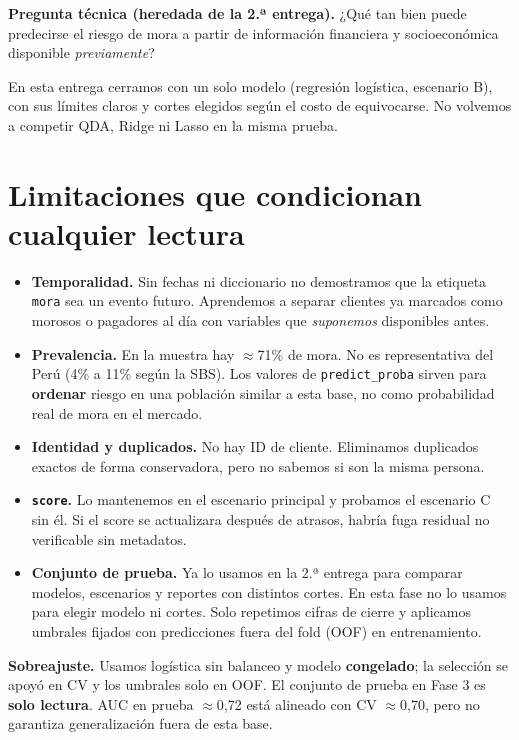 \documentclass[11pt]{article}
\begin{document}
\textbf{Pregunta técnica (heredada de la 2.ª entrega).} ¿Qué tan bien puede predecirse el riesgo de mora a partir de información financiera y socioeconómica disponible \emph{previamente}?

En esta entrega cerramos con un solo modelo (regresión logística, escenario B), con sus límites claros y cortes elegidos según el costo de equivocarse. No volvemos a competir QDA, Ridge ni Lasso en la misma prueba.

\section{Limitaciones que condicionan cualquier lectura}

\begin{itemize}
\item \textbf{Temporalidad.} Sin fechas ni diccionario no demostramos que la etiqueta \texttt{mora} sea un evento futuro. Aprendemos a separar clientes ya marcados como morosos o pagadores al día con variables que \emph{suponemos} disponibles antes.
\item \textbf{Prevalencia.} En la muestra hay $\approx$71\% de mora. No es representativa del Perú (4\% a 11\% según la SBS). Los valores de \texttt{predict\_proba} sirven para \textbf{ordenar} riesgo en una población similar a esta base, no como probabilidad real de mora en el mercado.
\item \textbf{Identidad y duplicados.} No hay ID de cliente. Eliminamos duplicados exactos de forma conservadora, pero no sabemos si son la misma persona.
\item \textbf{\texttt{score}.} Lo mantenemos en el escenario principal y probamos el escenario C sin él. Si el score se actualizara después de atrasos, habría fuga residual no verificable sin metadatos.
\item \textbf{Conjunto de prueba.} Ya lo usamos en la 2.ª entrega para comparar modelos, escenarios y reportes con distintos cortes. En esta fase no lo usamos para elegir modelo ni cortes. Solo repetimos cifras de cierre y aplicamos umbrales fijados con predicciones fuera del fold (OOF) en entrenamiento.
\end{itemize}

\noindent\textbf{Sobreajuste.} Usamos logística sin balanceo y modelo \textbf{congelado}; la selección se apoyó en CV y los umbrales solo en OOF. El conjunto de prueba en Fase 3 es \textbf{solo lectura}. AUC en prueba $\approx$0,72 está alineado con CV $\approx$0,70, pero no garantiza generalización fuera de esta base.
\end{document}

